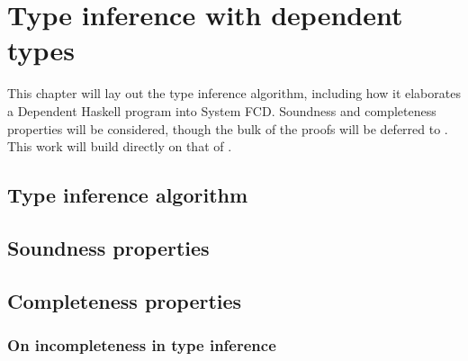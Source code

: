 \chapter{Type inference with dependent types}
\label{cha:type-inference}

\begin{proposal}
This chapter will lay out the type inference algorithm, including how it
elaborates a Dependent Haskell program into System FCD. Soundness and
completeness properties will be considered, though the bulk of the proofs
will be deferred to . This work will build directly
on that of \citet{outsidein}.
\end{proposal}

\section{Type inference algorithm}

\section{Soundness properties}

\section{Completeness properties}

\subsection{On incompleteness in type inference}
\label{sec:incomplete}

